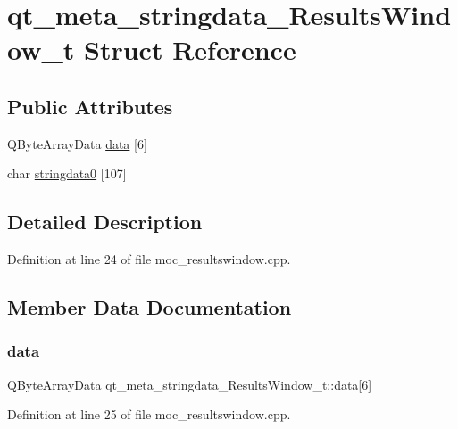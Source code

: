 \hypertarget{structqt__meta__stringdata___results_window__t}{}\section{qt\+\_\+meta\+\_\+stringdata\+\_\+\+Results\+Window\+\_\+t Struct Reference}
\label{structqt__meta__stringdata___results_window__t}
\subsection*{Public Attributes}
\begin{DoxyCompactItemize}
\item 
Q\+Byte\+Array\+Data \mbox{\hyperlink{structqt__meta__stringdata___results_window__t_a30f7698569370011dafad2b228dd266f}{data}} \mbox{[}6\mbox{]}
\item 
char \mbox{\hyperlink{structqt__meta__stringdata___results_window__t_a9018169b5e4fe41f90cdd2d40fd0db68}{stringdata0}} \mbox{[}107\mbox{]}
\end{DoxyCompactItemize}


\subsection{Detailed Description}


Definition at line 24 of file moc\+\_\+resultswindow.\+cpp.



\subsection{Member Data Documentation}
\mbox{\label{structqt__meta__stringdata___results_window__t_a30f7698569370011dafad2b228dd266f}} 
\subsubsection{\texorpdfstring{data}{data}}
{\footnotesize\ttfamily Q\+Byte\+Array\+Data qt\+\_\+meta\+\_\+stringdata\+\_\+\+Results\+Window\+\_\+t\+::data\mbox{[}6\mbox{]}}



Definition at line 25 of file moc\+\_\+resultswindow.\+cpp.

